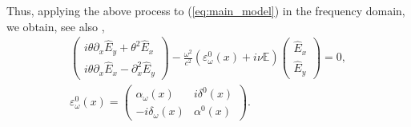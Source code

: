 Thus, applying the above process to (\ref{eq:main_model}) in the frequency domain, we obtain, see also \cite{Despres_2014},
\begin{align}
\label{eq:main_frequency_domain}
\left(
\begin{matrix}
 i\theta \partial_x \hat{E}_y+\theta^2 \hat{E}_x\\
 i\theta \partial_x \hat{E}_x -\partial_x^2 \hat{E}_y
\end{matrix}
\right)-\frac{\omega^2}{c^2}
\left(\varepsilon^{0}_{\omega}(x)+i\nu \mathbb{E}\right)\left(
\begin{matrix}
 \hat{E}_x\\
 \hat{E}_y
\end{matrix}
\right)
=0,\\
\label{eq:epsilon_0}
\varepsilon^0_{\omega}(x)=\left(
\begin{matrix}
 \alpha_{\omega}(x) & i\delta^{0}(x) \\
 -i\delta_{\omega}(x) & \alpha^{0}(x)
\end{matrix}
\right). 
\end{align}
